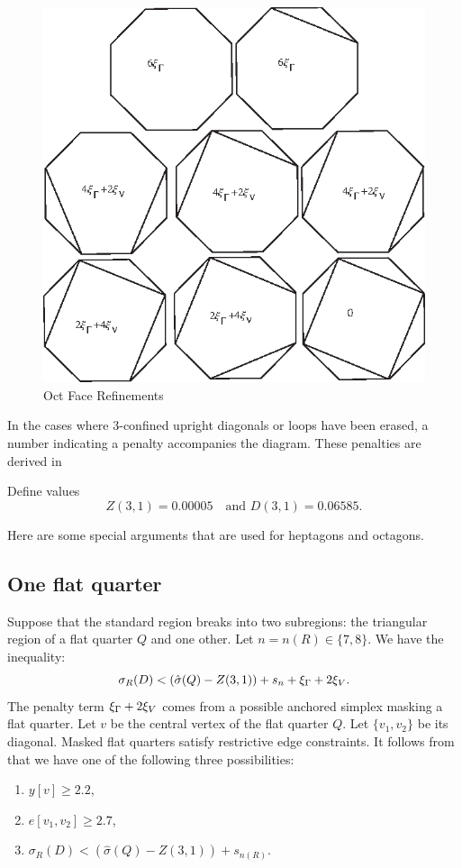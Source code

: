 \begin{figure}[htb]
  \centering
  \includegraphics{PS/octrefine.eps}
  \caption{Oct Face Refinements}
  \label{fig:octrefine}
\end{figure}

In the cases where $3$-confined upright diagonals or loops have
been erased, a number indicating a penalty accompanies the
diagram. These penalties are derived in 

Define values
    $$
    Z(3,1)=0.00005\quad\text{and }D(3,1)=0.06585.
    $$

Here are some special arguments that are used for heptagons and
octagons.

\subsection{One flat quarter}
Suppose that the standard region breaks into two
subregions: the triangular region of a flat quarter $Q$ and one
other. Let $n=n(R)\in\{7,8\}$. We have the inequality:
    $$
    \sigma_R(D) < (\hat\sigma(Q)-Z(3,1)) + s_{n} +\xi_\Gamma+2\xi_V.
    $$
The penalty term $\xi_\Gamma+2\xi_V$ comes from a possible anchored
simplex masking a flat quarter.   Let $v$ be the central vertex of
the flat quarter $Q$.  Let $\{v_1,v_2\}$ be its diagonal. Masked
flat quarters satisfy restrictive edge constraints.  It follows
from 
 that we have one of the
following three possibilities:
    \begin{enumerate}
    \item $y[v] \ge 2.2$,
    \item $e[v_1,v_2] \ge2.7$,
    \item $\sigma_R(D) < (\hat\sigma(Q)-Z(3,1)) + s_{n(R)}.$
    \end{enumerate}

